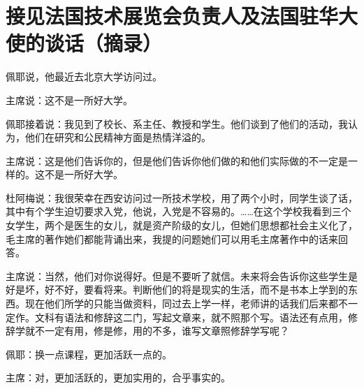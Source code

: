 \section[接见法国技术展览会负责人及法国驻华大使的谈话（摘录）（一九六四年九月十日）]{接见法国技术展览会负责人及法国驻华大使的谈话（摘录）}


佩耶说，他最近去北京大学访问过。

主席说：这不是一所好大学。

佩耶接着说：我见到了校长、系主任、教授和学生。他们谈到了他们的活动，我认为，他们在研究和公民精神方面是热情洋溢的。

主席说：这是他们告诉你的，但是他们告诉你他们做的和他们实际做的不一定是一样的。这不是一所好大学。

杜阿梅说：我很荣幸在西安访问过一所技术学校，用了两个小时，同学生谈了话，其中有个学生迫切要求入党，他说，入党是不容易的。……在这个学校我看到三个女学生，两个是医生的女儿，就是资产阶级的女儿，但她们思想都社会主义化了，毛主席的著作她们都能背诵出来，我提的问题她们可以用毛主席著作中的话来回答。

主席说：当然，他们对你说得好。但是不要听了就信。未来将会告诉你这些学生是好是坏，好不好，要看将来。判断他们的将是现实的生活，而不是书本上学到的东西。现在他们所学的只能当做资料，同过去上学一样，老师讲的话我们后来都不一定作。文科有语法和修辞这二门，写起文章来，就不照那个写。语法还有点用，修辞学就不一定有用，修是修，用的不多，谁写文章照修辞学写呢？

佩耶：换一点课程，更加活跃一点的。

主席：对，更加活跃的，更加实用的，合乎事实的。

